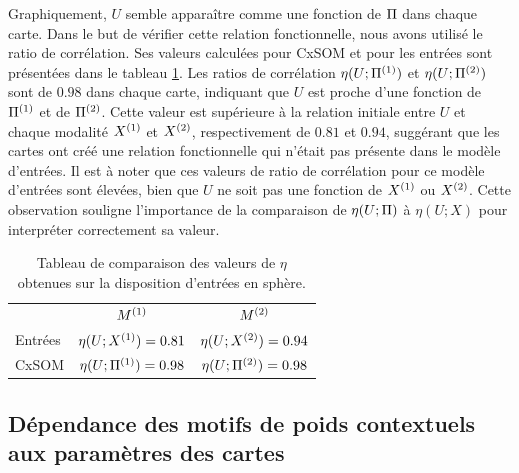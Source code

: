 \documentclass[../main]{subfiles}
\begin{document}
Graphiquement, $U$ semble apparaître comme une fonction de $\Pi$ dans chaque carte. Dans le but de vérifier cette relation fonctionnelle, nous avons utilisé le ratio de corrélation. Ses valeurs calculées pour CxSOM et pour les entrées sont présentées dans le tableau \ref{tab:eta2D}. Les ratios de corrélation $\eta(U;\Pi^{({1})})$ et $\eta(U;\Pi^{({2})})$ sont de $0.98$ dans chaque carte, indiquant que $U$ est proche d'une fonction de $\Pi^{({1})}$ et de $\Pi^{({2})}$. Cette valeur est supérieure à la relation initiale entre $U$ et chaque modalité $X^{({1})}$ et $X^{({2})}$, respectivement de $0.81$ et $0.94$, suggérant que les cartes ont créé une relation fonctionnelle qui n'était pas présente dans le modèle d'entrées.
Il est à noter que ces valeurs de ratio de corrélation pour ce modèle d'entrées sont élevées, bien que $U$ ne soit pas une fonction de $X^{({1})}$ ou $X^{({2})}$. 
Cette observation souligne l'importance de la comparaison de $\eta(U;\Pi)$ à $\eta(U;X)$ pour interpréter correctement sa valeur.

\begin{table}
	\caption{Tableau de comparaison des valeurs de $\eta$ obtenues sur la disposition d'entrées en sphère. \label{tab:eta2D}}
	\centering\begin{tabular}{lcc}
						&$M^{({1})}$ 					& $M^{({2})}$ 						\\
		Entrées 		& $\eta(U;X^{({1})}) = 0.81$ & $\eta(U;X^{({2})}) = 0.94$  \\
		CxSOM  	 		& $\eta(U;\Pi^{({1})}) = 0.98$ & $\eta(U;\Pi^{({2})}) = 0.98$ 	\\
	\end{tabular}
\end{table}

\subsection{Dépendance des motifs de poids contextuels aux paramètres des cartes \label{par:params2D}}
\end{document}
